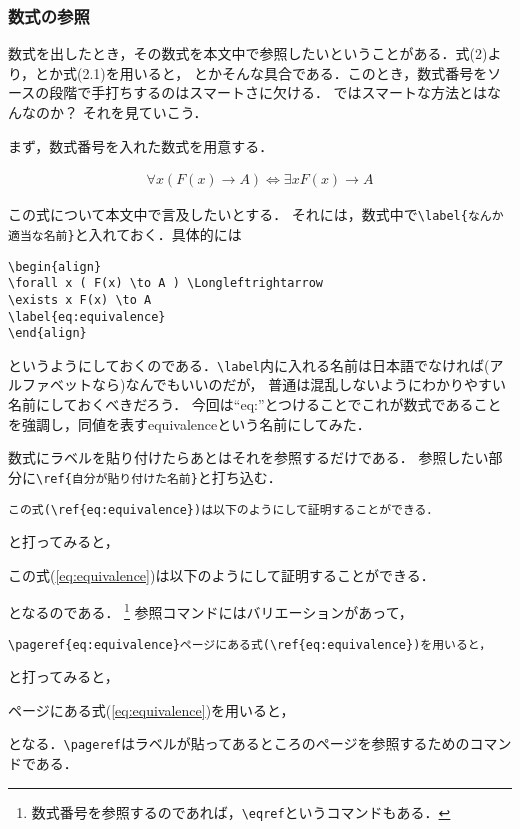 \subsubsection{数式の参照}
数式を出したとき，その数式を本文中で参照したいということがある．式(2)より，とか式(2.1)を用いると，
とかそんな具合である．このとき，数式番号をソースの段階で手打ちするのはスマートさに欠ける．
ではスマートな方法とはなんなのか？ それを見ていこう．

まず，数式番号を入れた数式を用意する．
\begin{oframed}
\begin{align}
\forall x ( F(x) \to A ) \Longleftrightarrow \exists x F(x) \to A
\label{eq:equivalence}
\end{align}
\end{oframed}
この式について本文中で言及したいとする．
それには，数式中で\verb|\label{なんか適当な名前}|と入れておく．具体的には
\begin{verbatim}
\begin{align}
\forall x ( F(x) \to A ) \Longleftrightarrow 
\exists x F(x) \to A 
\label{eq:equivalence}
\end{align}
\end{verbatim}
というようにしておくのである．\verb|\label|内に入れる名前は日本語でなければ(アルファベットなら)なんでもいいのだが，
普通は混乱しないようにわかりやすい名前にしておくべきだろう．
今回は``eq:''とつけることでこれが数式であることを強調し，同値を表すequivalenceという名前にしてみた．

数式にラベルを貼り付けたらあとはそれを参照するだけである．
参照したい部分に\verb|\ref{自分が貼り付けた名前}|と打ち込む．
\begin{verbatim}
この式(\ref{eq:equivalence})は以下のようにして証明することができる．
\end{verbatim}
と打ってみると，
\begin{oframed}
この式(\ref{eq:equivalence})は以下のようにして証明することができる．
\end{oframed}
となるのである．
\footnote{数式番号を参照するのであれば，\verb|\eqref|というコマンドもある．}
参照コマンドにはバリエーションがあって，
\begin{verbatim}
\pageref{eq:equivalence}ページにある式(\ref{eq:equivalence})を用いると，
\end{verbatim}
と打ってみると，
\begin{oframed}
\pageref{eq:equivalence}ページにある式(\ref{eq:equivalence})を用いると，
\end{oframed}
となる．\verb|\pageref|はラベルが貼ってあるところのページを参照するためのコマンドである．

